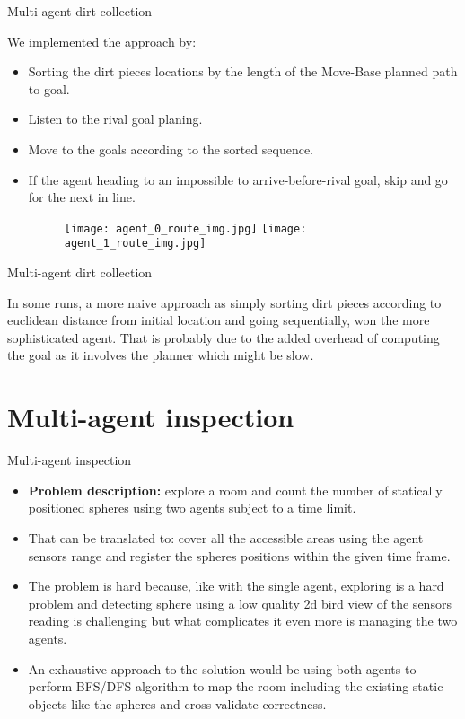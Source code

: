 \documentclass[10pt]{beamer}
\begin{document}
\begin{frame}{Multi-agent dirt collection}
\graphicspath{{images/}}
We implemented the approach by:
\begin{itemize}
\item Sorting the dirt pieces locations by the length of the Move-Base planned path to goal.
\item Listen to the rival goal planing.
\item Move to the goals according to the sorted sequence.
\item If the agent heading to an impossible to arrive-before-rival goal, skip and go for the next in line.
\bigskip
\begin{figure}[htp]
\texttt{[image: agent\_0\_route\_img.jpg]}
\texttt{[image: agent\_1\_route\_img.jpg]}
\label{fig:galaxy}
\end{figure}
\end{itemize}
\end{frame}

\begin{frame}{Multi-agent dirt collection}

\bigskip
In some runs, a more naive approach as simply sorting dirt pieces according to euclidean distance from initial location and going sequentially, won the more sophisticated agent. 
That is probably due to the added overhead of computing the goal as it involves the planner which might be slow.
\end{frame}

\section{Multi-agent inspection}
\begin{frame}{Multi-agent inspection}
\begin{itemize}
    \item {\bf Problem description:} explore a room and count the number of statically positioned spheres using two agents subject to a time limit. 
    \item That can be translated to: cover all the accessible areas using the agent sensors range and register the spheres positions within the given time frame.
    \item The problem is hard because, like with the single agent,  exploring is a hard problem and detecting sphere using a low quality 2d bird view of the sensors reading is challenging but what complicates it even more is managing the two agents.
    \item An exhaustive approach to the solution would be using both agents to perform BFS/DFS algorithm to map the room including the existing static objects like the spheres and cross validate correctness.
\end{itemize}
\end{frame}
\end{document}
